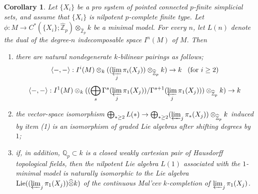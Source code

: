 \documentclass[11pt]{amsart}
\newtheorem{corollary}[theorem]{Corollary}
\theoremstyle{definition}
\numberwithin{equation}{section}
\numberwithin{equation}{section}
\newcommand\QQ{\mathbb{Q}}
\newcommand\ZZ{\mathbb{Z}}
\DeclareMathOperator{\Lie}{Lie}
\begin{document}
\begin{corollary}\label{Cor: duality between minimal model and homotopy groups for pro spaces}
Let $\{X_i\}$ be a pro system of pointed connected $p$-finite simplicial sets, and assume that $\{X_i\}$ is nilpotent $p$-complete finite type. Let $\phi:M\rightarrow C^*(\{X_i\};\widehat{\ZZ}_p)\otimes_{\widehat{\ZZ}_p} k$ be a minimal model. For every $n$, let $L(n)$ denote the dual of the degree-$n$ indecomposable space $I^n(M)$ of $M$. Then
\begin{enumerate}[leftmargin=0.25in]
    \item there are natural nondegenerate $k$-bilinear pairings as follows;
    \[
\langle -,- \rangle: I^i(M)\otimes_{k} ((\varprojlim_j \pi_i(X_j))\otimes_{\widehat{\ZZ}_p} k) \rightarrow k \text{\,\,\, (for $i\geq 2$)}
\]
\[
\langle -,- \rangle: I^1(M)\otimes_{k} ((\bigoplus_s \Gamma^s(\varprojlim_j \pi_1(X_j))/\Gamma^{s+1}(\varprojlim_j \pi_1(X_j)))\otimes_{\widehat{\ZZ}_p} k) \rightarrow k
\]
    \item the vector-space isomorphism $\bigoplus_{*\geq 2} L(*)\rightarrow \bigoplus_{*\geq 2}(\varprojlim_j \pi_*(X_j))\otimes_{\widehat{\ZZ}_p} k$ induced by item (1) is an isomorphism of graded Lie algebras after shifting degrees by $1$;
    \item if, in addition, $\QQ_p\subset k$ is a closed weakly cartesian pair of Hausdorff topological fields, then the nilpotent Lie algebra $L(1)$ associated with the $1$-minimal model is naturally isomorphic to the Lie algebra $\Lie((\varprojlim_j \pi_1(X_j))\widehat{\otimes} k)$ of the continuous Mal'cev $k$-completion of $\varprojlim_j \pi_1(X_j)$.
\end{enumerate}    
\end{corollary}
\end{document}
